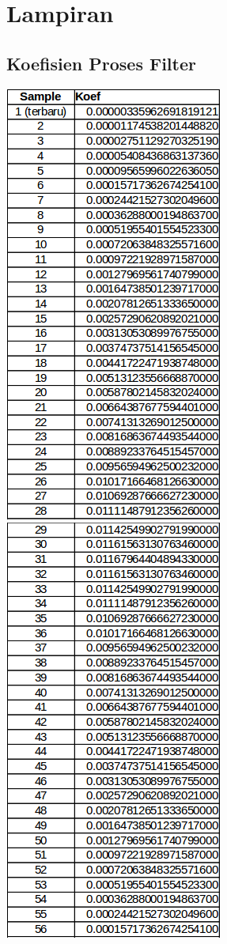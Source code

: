 \chapter*{Lampiran}

\section{Koefisien Proses Filter}\label{lampiran:bandpass}
\begin{table}[H]
	\includegraphics[scale=0.6]{images/koef1.png}
	\includegraphics[scale=0.6]{images/koef2.png}

\end{table}

